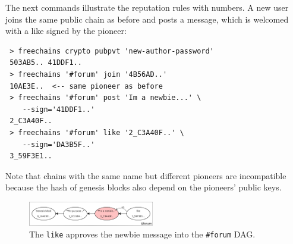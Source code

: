 \documentclass[10pt,journal,compsoc]{IEEEtran}
\begin{document}
The next commands illustrate the reputation rules with numbers.
A new user joins the same public chain as before and posts a message, which is
welcomed with a like signed by the pioneer:

{\footnotesize
\begin{verbatim}
 > freechains crypto pubpvt 'new-author-password'
 503AB5.. 41DDF1..
 > freechains '#forum' join '4B56AD..'
 10AE3E..  <-- same pioneer as before
 > freechains '#forum' post 'Im a newbie...' \
    --sign='41DDF1..'
 2_C3A40F..
 > freechains '#forum' like '2_C3A40F..' \
    --sign='DA3B5F..'
 3_59F3E1..
\end{verbatim}
}

Note that chains with the same name but different pioneers are incompatible
because the hash of genesis blocks also depend on the pioneers' public keys.

\begin{figure}[ht]
\centering
\includegraphics[width=0.49\textwidth]{forum.png}
\caption{
    The \texttt{like} approves the newbie message into the \texttt{\#forum} DAG.
}
\label{fig.forum}
\end{figure}
\end{document}
